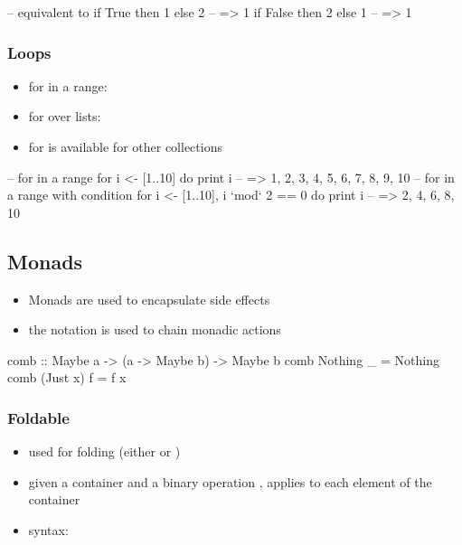 \documentclass[a4paper,landscape,10pt]{article}
\begin{document}
\begin{multicols*}{2}
\begin{haskell}
-- equivalent to
if True then 1 else 2 -- => 1
if False then 2 else 1 -- => 1
\end{haskell}

  \subsubsection{Loops}

  \begin{itemize}
    \item for in a range: 
    \item for over lists: 
    \item for is available for other collections
  \end{itemize}

  \begin{haskell}
-- for in a range
for i <- [1..10] do
  print i -- => 1, 2, 3, 4, 5, 6, 7, 8, 9, 10
-- for in a range with condition
for i <- [1..10], i `mod` 2 == 0 do
  print i -- => 2, 4, 6, 8, 10
\end{haskell}

  \breakcolumn

  \subsection{Monads}

  \begin{itemize}
    \item Monads are used to encapsulate side effects
    \item the  notation is used to chain monadic actions
  \end{itemize}

  \begin{haskell}
comb :: Maybe a -> (a -> Maybe b) -> Maybe b
comb Nothing _ = Nothing
comb (Just x) f = f x
\end{haskell}

  \subsubsection{Foldable}

  \begin{itemize}
    \item used for folding (either  or )
    \item given a container and a binary operation , applies  to each element of the container
    \item syntax: 
  \end{itemize}


\end{multicols*}
\end{document}
